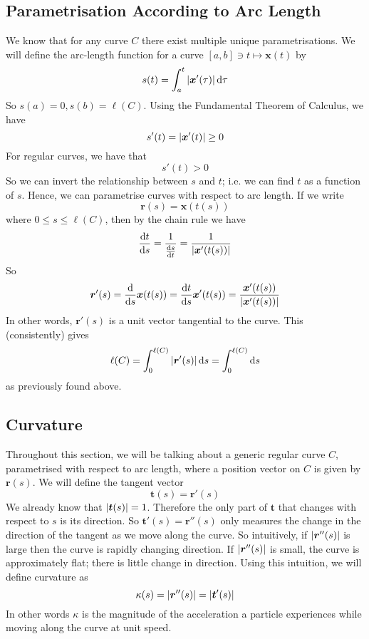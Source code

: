 \documentclass{article}
\begin{document}
\subsection{Parametrisation According to Arc Length}
We know that for any curve $C$ there exist multiple unique parametrisations. We will define the arc-length function for a curve $[a, b] \ni t \mapsto \bm x(t)$ by
\[ s(t) = \int_a^t \abs{\bm x'(\tau)} \,\dd \tau \]
So $s(a) = 0, s(b) = \ell(C)$. Using the Fundamental Theorem of Calculus, we have
\[ s'(t) = \abs{\bm x'(t)} \geq 0 \]
For regular curves, we have that
\[ s'(t) > 0 \]
So we can invert the relationship between $s$ and $t$; i.e. we can find $t$ as a function of $s$. Hence, we can parametrise curves with respect to arc length. If we write
\[ \bm r(s) = \bm x(t(s)) \]
where $0 \leq s \leq \ell(C)$, then by the chain rule we have
\[ \frac{\dd t}{\dd s} = \frac{1}{\frac{\dd s}{\dd t}} = \frac{1}{\abs{\bm x'(t(s))}} \]
So
\[ \bm r'(s) = \frac{\dd}{\dd s} \bm x(t(s)) = \frac{\dd t}{\dd s} \bm x'(t(s)) = \frac{\bm x'(t(s))}{\abs{\bm x'(t(s))}} \]
In other words, $\bm r'(s)$ is a unit vector tangential to the curve. This (consistently) gives
\[ \ell(C) = \int_0^{\ell(C)} \abs{\bm r'(s)} \,\dd s = \int_0^{\ell(C)} \dd s \]
as previously found above.

\subsection{Curvature}
Throughout this section, we will be talking about a generic regular curve $C$, parametrised with respect to arc length, where a position vector on $C$ is given by $\bm r(s)$. We will define the tangent vector
\[ \bm t(s) = \bm r'(s) \]
We already know that $\abs{\bm t(s)} = 1$. Therefore the only part of $\bm t$ that changes with respect to $s$ is its direction. So $\bm t'(s) = \bm r''(s)$ only measures the change in the direction of the tangent as we move along the curve. So intuitively, if $\abs{\bm r''(s)}$ is large then the curve is rapidly changing direction. If $\abs{\bm r''(s)}$ is small, the curve is approximately flat; there is little change in direction. Using this intuition, we will define curvature as
\[ \kappa(s) = \abs{\bm r''(s)} = \abs{\bm t'(s)} \]
In other words $\kappa$ is the magnitude of the acceleration a particle experiences while moving along the curve at unit speed.
\end{document}
